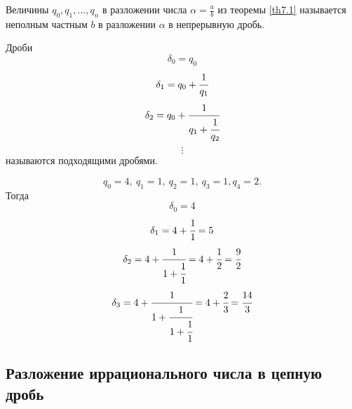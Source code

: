     \begin{definition}
        Величины $q_0, q_1, \dots, q_n$ в разложении числа $\alpha=\frac{a}{b}$ из теоремы \ref{th7.1} называется неполным частным $b$ в разложении $\alpha$ в непрерывную дробь.
    \end{definition} 
        Дроби \[\delta_0=q_0\]
        \[\delta_1=q_0+\cfrac{1}{q_1}\] 
        \[\delta_2=q_0+\cfrac{1}{q_1+\cfrac{1}{q_2}}\]
        \[\vdots\]
    называются подходящими дробями.
    \begin{example}
    \[q_0=4,\ q_1=1,\ q_2=1,\ q_3=1, q_4=2.\]
    Тогда
    \[\delta_0=4\]
    \[\delta_1=4+\cfrac{1}{1}=5\]
    \[\delta_2=4+\cfrac{1}{1+\cfrac{1}{1}}=4+\cfrac{1}{2}=\cfrac{9}{2}\]
    \[\delta_3=4+\cfrac{1}{1+\cfrac{1}{1+\cfrac{1}{1}}}=4+\cfrac{2}{3}=\cfrac{14}{3}\]
    \end{example}
    \subsection*{Разложение иррационального числа в цепную дробь}
    
